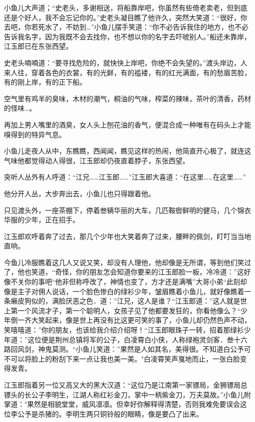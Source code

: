 \documentclass[12pt,oneside]{book}
\begin{document}
小鱼儿大声道；``史老头，多谢相送，将船靠岸吧，你虽然有些倚老卖老，但到底还是个好人，我不会忘记你的。''史老头凝目瞧了他许久，突然大笑道：``很好，你去吧，你若死水了，不妨到\ldots{}''小鱼儿摆手笑道：``你不必告诉我住的地方，也不必告诉我名字，因为我既不会去找你，也不想以你的名字去吓唬别人。''船还未靠岸，江玉郎已在东张西望。

史老头喃喃道：``要寻找危险的，就快快上岸吧，你绝不会失望的。''渡头岸边，人来人往，穿着各色的衣裳，有的光鲜，有的褴褛，有的红光满面，有的愁眉苦脸，有的刚上岸，有的正下船。

空气里有鸡羊的臭味，木材的潮气，桐油的气味，榨菜的辣味，茶叶的清香，药材的怪味\ldots。

再加上男人嘴里的酒臭，女人头上刨花油的香气，便混合成一种唯有在码头上才能嗅得到的特异气息。

小鱼儿走夜人从中，东瞧瞧，西闻闻，瞧见这样的热闹，他简直开心极了，就连这气味他都觉得动人得很，江玉郎却仍夜直着脖子，东张西望。

突听人丛外有人呼道：``江兄\ldots\ldots 江玉郎\ldots\ldots{}''江玉郎大喜道：``在这里\ldots\ldots 在这里\ldots\ldots{}''

他分开人丛，大步奔出去，小鱼儿也只得跟着他。

只见渡头外，一座茶棚下，停着叁辆华丽的大车，几匹鞍辔鲜明的健马，几个锦衣华服的少年，正在招手。

江玉郎欢呼着奔了过去，那几个少年也大笑着奔了过来，腰畔的佩剑，盯叮当当地直响。

今鱼儿冷服瞧着这几人又说又笑，却没有人理他，他却像是无所谓，等到他们笑过了，他也笑道，``奇怪，你的朋友怎会知道你要来的江玉郎脸一板，冷冷道：''这好像不关你的事吧``他非但称呼改了，神情也变了，方才还是满嘴''大哥小弟``此刻却像是主子对佣人说话，一个脸色惨白的绿衫少年，皱眉瞧着小鱼儿，就好像瞧着一条癞皮狗似的，满脸厌恶之色．道：''江兄，这人是谁？``江玉郎道：''这人就是世上第一个风流才子，第一个聪明人，女孩子见了他都要发狂的，你看他像么？``少年倒一齐大笑起来，像是世上再没有比这更可笑的事了，小鱼儿却仍然色声不动，笑嘻嘻道：''你的朋友，也该给我介绍介绍呀！``江玉郎眼珠子一转，招着那绿衫少年道：''这位便是荆州总镇将军的公子，白凌霄白小侠，人称绿袍灵剑客．叁十六路回风剑，神鬼莫测。``小鱼儿笑道：''果然是人如其名，美得很。不知道白公予可不可以将脸上的粉刮下来一点让我也美一美。"白凌霄笑声戛地而止，一张白脸变得发青。

江玉郎指着另一位又高又大的黑大汉道：``这位乃是江南第一家镖局，金狮镖局总镖头的长公子李明生，江湖人称红衫金刀，掌中一柄紫金刀，万夫莫故。''小鱼儿附掌道："果然是相貌堂堂，威风凛凛。但幸好你解释得清楚，否则我难免要误会这位李公予是杀猪的。李明生两只铜铃般的眼睛，像是要凸了出来。
\end{document}
